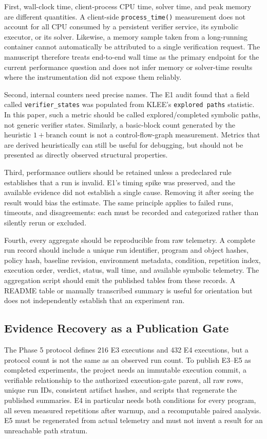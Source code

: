 First, wall-clock time, client-process CPU time, solver time, and peak memory are different quantities. A client-side \texttt{process\_time()} measurement does not account for all CPU consumed by a persistent verifier service, its symbolic executor, or its solver. Likewise, a memory sample taken from a long-running container cannot automatically be attributed to a single verification request. The manuscript therefore treats end-to-end wall time as the primary endpoint for the current performance question and does not infer memory or solver-time results where the instrumentation did not expose them reliably.

Second, internal counters need precise names. The E1 audit found that a field called \texttt{verifier\_states} was populated from KLEE's \texttt{explored paths} statistic. In this paper, such a metric should be called explored/completed symbolic paths, not generic verifier states. Similarly, a basic-block count generated by the heuristic $1+\text{branch count}$ is not a control-flow-graph measurement. Metrics that are derived heuristically can still be useful for debugging, but should not be presented as directly observed structural properties.

Third, performance outliers should be retained unless a predeclared rule establishes that a run is invalid. E1's timing spike was preserved, and the available evidence did not establish a single cause. Removing it after seeing the result would bias the estimate. The same principle applies to failed runs, timeouts, and disagreements: each must be recorded and categorized rather than silently rerun or excluded.

Fourth, every aggregate should be reproducible from raw telemetry. A complete run record should include a unique run identifier, program and object hashes, policy hash, baseline revision, environment metadata, condition, repetition index, execution order, verdict, status, wall time, and available symbolic telemetry. The aggregation script should emit the published tables from these records. A README table or manually transcribed summary is useful for orientation but does not independently establish that an experiment ran.

\subsection{Evidence Recovery as a Publication Gate}
The Phase 5 protocol defines 216 E3 executions and 432 E4 executions, but a protocol count is not the same as an observed run count. To publish E3--E5 as completed experiments, the project needs an immutable execution commit, a verifiable relationship to the authorized execution-gate parent, all raw rows, unique run IDs, consistent artifact hashes, and scripts that regenerate the published summaries. E4 in particular needs both conditions for every program, all seven measured repetitions after warmup, and a recomputable paired analysis. E5 must be regenerated from actual telemetry and must not invent a result for an unreachable path stratum.

